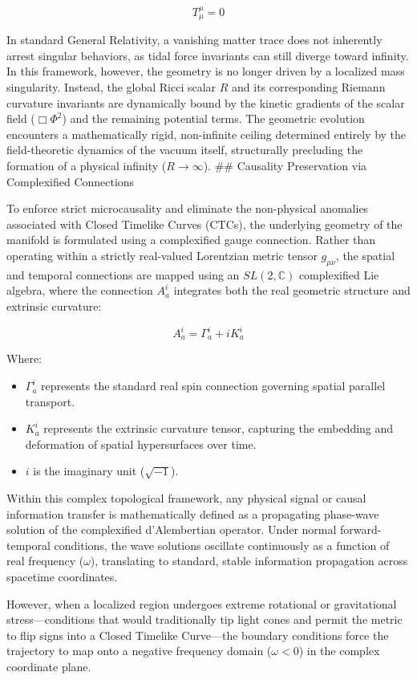 \[T^\mu_\mu = 0\]

In standard General Relativity, a vanishing matter trace does not
inherently arrest singular behaviors, as tidal force invariants can
still diverge toward infinity. In this framework, however, the geometry
is no longer driven by a localized mass singularity. Instead, the global
Ricci scalar \(R\) and its corresponding Riemann curvature invariants
are dynamically bound by the kinetic gradients of the scalar field
(\(\Box\Phi^2\)) and the remaining potential terms. The geometric
evolution encounters a mathematically rigid, non-infinite ceiling
determined entirely by the field-theoretic dynamics of the vacuum
itself, structurally precluding the formation of a physical infinity
(\(R \to \infty\)). \#\# Causality Preservation via Complexified
Connections

To enforce strict microcausality and eliminate the non-physical
anomalies associated with Closed Timelike Curves (CTCs), the underlying
geometry of the manifold is formulated using a complexified gauge
connection. Rather than operating within a strictly real-valued
Lorentzian metric tensor \(g_{\mu\nu}\), the spatial and temporal
connections are mapped using an \(SL(2, \mathbb{C})\) complexified Lie
algebra, where the connection \(A_a^i\) integrates both the real
geometric structure and extrinsic curvature:

\[A_a^i = \Gamma_a^i + i K_a^i\]

Where:

\begin{itemize}
\tightlist
\item
  \(\Gamma_a^i\) represents the standard real spin connection governing
  spatial parallel transport.
\item
  \(K_a^i\) represents the extrinsic curvature tensor, capturing the
  embedding and deformation of spatial hypersurfaces over time.
\item
  \(i\) is the imaginary unit (\(\sqrt{-1}\)).
\end{itemize}

Within this complex topological framework, any physical signal or causal
information transfer is mathematically defined as a propagating
phase-wave solution of the complexified d'Alembertian operator. Under
normal forward-temporal conditions, the wave solutions oscillate
continuously as a function of real frequency (\(\omega\)), translating
to standard, stable information propagation across spacetime
coordinates.

However, when a localized region undergoes extreme rotational or
gravitational stress---conditions that would traditionally tip light
cones and permit the metric to flip signs into a Closed Timelike
Curve---the boundary conditions force the trajectory to map onto a
negative frequency domain (\(\omega < 0\)) in the complex coordinate
plane.

